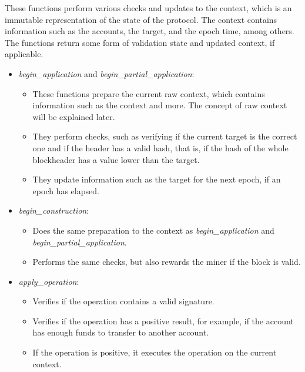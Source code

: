 These functions perform various checks and updates to the context, which is an immutable representation of the state of the protocol. The context contains information such as the accounts, the target, and the epoch time, among others. The functions return some form of validation state and updated context, if applicable.

\begin{itemize}

    \item \emph{begin\_application} and \emph{begin\_partial\_application}:
        \begin{itemize}
            \item These functions prepare the current raw context, which contains information such as the context and more. The concept of raw context will be explained later.
            \item They perform checks, such as verifying if the current target is the correct one and if the header has a valid hash, that is, if the hash of the whole blockheader has a value lower than the target.
            \item They update information such as the target for the next epoch, if an epoch has elapsed.
        \end{itemize}

    \item \emph{begin\_construction}:
        \begin{itemize}
            \item Does the same preparation to the context as \emph{begin\_application} and \emph{begin\_partial\_application}.
            \item Performs the same checks, but also rewards the miner if the block is valid.
        \end{itemize}

    \item \emph{apply\_operation}:
        \begin{itemize}
            \item Verifies if the operation contains a valid signature.
            \item Verifies if the operation has a positive result, for example, if the account has enough funds to transfer to another account.
            \item If the operation is positive, it executes the operation on the current context.
        \end{itemize}


\end{itemize}

